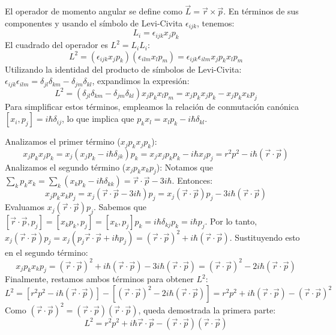 \documentclass[a4paper]{article}
\begin{document}
El operador de momento angular se define como $\vec{L} = \vec{r} \times \vec{p}$. En términos de sus componentes y usando el símbolo de Levi-Civita $\epsilon_{ijk}$, tenemos:
\begin{equation}
L_i = \epsilon_{ijk} x_j p_k
\end{equation}
El cuadrado del operador es $L^2 = L_i L_i$:
\begin{equation}
L^2 = (\epsilon_{ijk} x_j p_k) (\epsilon_{ilm} x_l p_m) = \epsilon_{ijk} \epsilon_{ilm} x_j p_k x_l p_m
\end{equation}
Utilizando la identidad del producto de símbolos de Levi-Civita: $\epsilon_{ijk} \epsilon_{ilm} = \delta_{jl}\delta_{km} - \delta_{jm}\delta_{kl}$, expandimos la expresión:
\begin{equation}
L^2 = (\delta_{jl}\delta_{km} - \delta_{jm}\delta_{kl}) x_j p_k x_l p_m = x_j p_k x_j p_k - x_j p_k x_k p_j
\end{equation}
Para simplificar estos términos, empleamos la relación de conmutación canónica $[x_i, p_j] = i\hbar \delta_{ij}$, lo que implica que $p_k x_l = x_l p_k - i\hbar \delta_{kl}$.

Analizamos el primer término ($x_j p_k x_j p_k$):
\begin{equation}
x_j p_k x_j p_k = x_j (x_j p_k - i\hbar \delta_{jk}) p_k = x_j x_j p_k p_k - i\hbar x_j p_j = r^2 p^2 - i\hbar (\vec{r} \cdot \vec{p})
\end{equation}
Analizamos el segundo término ($x_j p_k x_k p_j$):
Notamos que $\sum_k p_k x_k = \sum_k (x_k p_k - i\hbar \delta_{kk}) = \vec{r} \cdot \vec{p} - 3i\hbar$. Entonces:
\begin{equation}
x_j p_k x_k p_j = x_j (\vec{r} \cdot \vec{p} - 3i\hbar) p_j = x_j (\vec{r} \cdot \vec{p}) p_j - 3i\hbar (\vec{r} \cdot \vec{p})
\end{equation}
Evaluamos $x_j (\vec{r} \cdot \vec{p}) p_j$. Sabemos que $[\vec{r} \cdot \vec{p}, p_j] = [x_k p_k, p_j] = [x_k, p_j] p_k = i\hbar \delta_{kj} p_k = i\hbar p_j$. Por lo tanto, $x_j (\vec{r} \cdot \vec{p}) p_j = x_j (p_j \vec{r} \cdot \vec{p} + i\hbar p_j) = (\vec{r} \cdot \vec{p})^2 + i\hbar (\vec{r} \cdot \vec{p})$.
Sustituyendo esto en el segundo término:
\begin{equation}
x_j p_k x_k p_j = (\vec{r} \cdot \vec{p})^2 + i\hbar (\vec{r} \cdot \vec{p}) - 3i\hbar (\vec{r} \cdot \vec{p}) = (\vec{r} \cdot \vec{p})^2 - 2i\hbar (\vec{r} \cdot \vec{p})
\end{equation}
Finalmente, restamos ambos términos para obtener $L^2$:
\begin{equation}
L^2 = [r^2 p^2 - i\hbar (\vec{r} \cdot \vec{p})] - [(\vec{r} \cdot \vec{p})^2 - 2i\hbar (\vec{r} \cdot \vec{p})] = r^2 p^2 + i\hbar (\vec{r} \cdot \vec{p}) - (\vec{r} \cdot \vec{p})^2
\end{equation}
Como $(\vec{r} \cdot \vec{p})^2 = (\vec{r} \cdot \vec{p})(\vec{r} \cdot \vec{p})$, queda demostrada la primera parte:
\begin{equation}
L^2 = r^2 p^2 + i\hbar \vec{r} \cdot \vec{p} - (\vec{r} \cdot \vec{p}) (\vec{r} \cdot \vec{p})
\end{equation}
\end{document}
